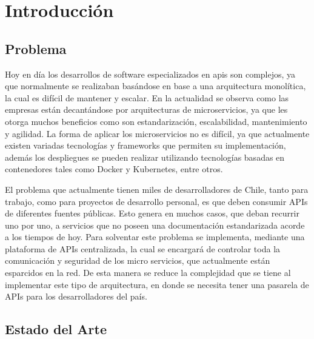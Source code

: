 
\chapter{Introducción}

  \section{Problema}

 Hoy en día los desarrollos de software especializados en apis son complejos, ya que normalmente se realizaban basándose en base a una arquitectura monolítica, la cual es difícil de  mantener y escalar. En la actualidad se observa como las empresas están decantándose por arquitecturas de microservicios, ya que les otorga muchos beneficios como son estandarización, escalabilidad, mantenimiento y agilidad.
La forma de aplicar los microservicios no es difícil, ya que actualmente existen variadas tecnologías y frameworks que permiten su implementación, además los despliegues se pueden realizar utilizando tecnologías basadas en contenedores tales como Docker y Kubernetes, entre otros. 

\hfill

El problema  que actualmente tienen miles de desarrolladores de Chile,  tanto para trabajo, como para proyectos de desarrollo personal, es que deben  consumir APIs de diferentes fuentes públicas.  Esto genera en muchos casos, que deban recurrir uno por uno, a servicios que no poseen una documentación estandarizada acorde a los tiempos de hoy. Para solventar este problema se implementa, mediante una plataforma de APIs centralizada, la cual se encargará de controlar toda la comunicación y seguridad de los micro servicios, que actualmente están esparcidos en la red. De esta manera se reduce la complejidad que se tiene al implementar este tipo de arquitectura, en donde se necesita tener una pasarela de APIs para los desarrolladores del país.




  \section{Estado del Arte}
  



